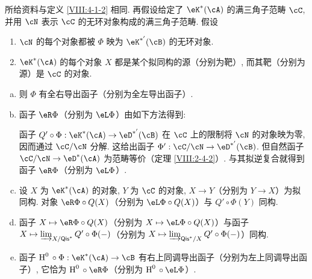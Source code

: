 \setcounter{subsubsection}{1}
\def\sgaviiianchorsuffix{theorem}
\begin{theorem}\label{VIII:4-2-3}
所给资料与定义 \ref{VIII:4-1-2} 相同. 再假设给定了 $\eK^\ast(\cA)$ 的满三角子范畴 $\cC$, 并用 $\cN$ 表示 $\cC$ 的无环对象构成的满三角子范畴. 假设
\begin{enumerate}[(1)]
  \item $\cN$ 的每个对象都被 $\Phi$ 映为 $\eK^{\ast'}(\cB)$ 的无环对象.
  \item $\eK^\ast(\cA)$ 的每个对象 $X$ 都是某个拟同构的源（分别为靶）, 而其靶（分别为源）是 $\cC$ 的对象.
\end{enumerate}
\begin{enumerate}[a)]
  \item 则 $\Phi$ 有全右导出函子（分别为全左导出函子）.
  \item 函子 $\eR \Phi$（分别为 $\eL \Phi$）由如下方法得到:

    函子 $Q'\circ \Phi:\eK^\ast(\cA) \to \eD^{\ast'}(\cB)$ 在 $\cC$ 上的限制将 $\cN$ 的对象映为零, 因而通过 $\cC/\cN$ 分解. 这给出函子 $\Phi':\cC/\cN\to \eD^{\ast'}(\cB)$. 但自然函子 $\cC/\cN\to \eD^\ast(\cA)$ 为范畴等价（定理 \ref{VIII:2-4-2}）. 与其拟逆复合就得到函子 $\eR\Phi$（分别为 $\eL \Phi$）.
  \item 设 $X$ 为 $\eK^\ast(\cA)$ 的对象, $Y$ 为 $\cC$ 的对象, $X\to Y$（分别为 $Y\to X$）为拟同构. 对象 $\eR\Phi\circ Q(X)$（分别为 $\eL \Phi\circ Q(X)$）与 $Q'\circ \Phi(Y)$ 同构.
  \item 函子 $X\mapsto \eR\Phi\circ Q(X)$（分别为 $X\mapsto \eL \Phi\circ Q(X)$）与函子 $X\mapsto \varinjlim_{X/\mathsf{Qis}^\ast} Q'\circ\Phi(-)$（分别为 $X\mapsto \varinjlim_{\mathsf{Qis}^\ast/X} Q'\circ \Phi(-)$）同构.
  \item 函子 $\h^0{}\circ \Phi:\eK^\ast(\cA)\to \cB$ 有右上同调导出函子（分别为左上同调导出函子）, 它恰为 $\h^0{}\circ\eR\Phi$（分别为 $\h^0{}\circ \eL\Phi$）.
\end{enumerate}
\end{theorem}

